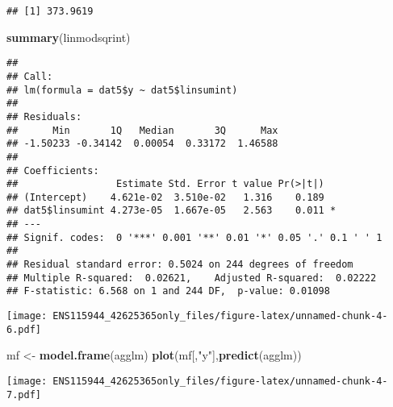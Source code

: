 \documentclass[
]{article}
\newenvironment{Shaded}{\begin{snugshade}}{\end{snugshade}}
\newcommand{\DataTypeTok}[1]{\textcolor[rgb]{0.13,0.29,0.53}{#1}}
\newcommand{\DecValTok}[1]{\textcolor[rgb]{0.00,0.00,0.81}{#1}}
\newcommand{\FloatTok}[1]{\textcolor[rgb]{0.00,0.00,0.81}{#1}}
\newcommand{\KeywordTok}[1]{\textcolor[rgb]{0.13,0.29,0.53}{\textbf{#1}}}
\newcommand{\NormalTok}[1]{#1}
\newcommand{\OperatorTok}[1]{\textcolor[rgb]{0.81,0.36,0.00}{\textbf{#1}}}
\newcommand{\StringTok}[1]{\textcolor[rgb]{0.31,0.60,0.02}{#1}}
\begin{document}
\begin{verbatim}
## [1] 373.9619
\end{verbatim}

\begin{Shaded}
\begin{Highlighting}[]
\KeywordTok{summary}\NormalTok{(linmodsqrint)}
\end{Highlighting}
\end{Shaded}

\begin{verbatim}
## 
## Call:
## lm(formula = dat5$y ~ dat5$linsumint)
## 
## Residuals:
##      Min       1Q   Median       3Q      Max 
## -1.50233 -0.34142  0.00054  0.33172  1.46588 
## 
## Coefficients:
##                 Estimate Std. Error t value Pr(>|t|)  
## (Intercept)    4.621e-02  3.510e-02   1.316    0.189  
## dat5$linsumint 4.273e-05  1.667e-05   2.563    0.011 *
## ---
## Signif. codes:  0 '***' 0.001 '**' 0.01 '*' 0.05 '.' 0.1 ' ' 1
## 
## Residual standard error: 0.5024 on 244 degrees of freedom
## Multiple R-squared:  0.02621,    Adjusted R-squared:  0.02222 
## F-statistic: 6.568 on 1 and 244 DF,  p-value: 0.01098
\end{verbatim}

\begin{Shaded}
\end{Shaded}

\texttt{[image: ENS115944\_42625365only\_files/figure-latex/unnamed-chunk-4-6.pdf]}

\begin{Shaded}
\begin{Highlighting}[]
\NormalTok{mf <-}\StringTok{ }\KeywordTok{model.frame}\NormalTok{(agglm)}
\KeywordTok{plot}\NormalTok{(mf[,}\StringTok{"y"}\NormalTok{],}\KeywordTok{predict}\NormalTok{(agglm))}
\end{Highlighting}
\end{Shaded}

\texttt{[image: ENS115944\_42625365only\_files/figure-latex/unnamed-chunk-4-7.pdf]}
\end{document}

